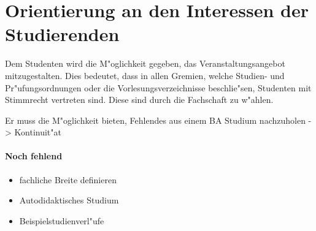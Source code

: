 \section{Orientierung an den Interessen der Studierenden}
Dem Studenten wird die M"oglichkeit gegeben, das Veranstaltungsangebot mitzugestalten. 
Dies bedeutet, dass in allen Gremien, welche Studien- und Pr"ufungsordnungen oder die 
Vorlesungsverzeichnisse beschlie"sen, Studenten mit Stimmrecht vertreten sind. Diese sind
durch die Fachschaft zu w"ahlen.

\begin{kcmt}\begin{komacmt}
Er muss die M"oglichkeit bieten, Fehlendes aus einem BA Studium nachzuholen -> Kontinuit"at
\end{komacmt}\end{kcmt}

\begin{kcmt}\begin{komacmt}
\paragraph{Noch fehlend}
\begin{itemize}
 \item fachliche Breite definieren
 \item Autodidaktisches Studium
 \item Beispielstudienverl"ufe
\end{itemize}
\end{komacmt}\end{kcmt}
